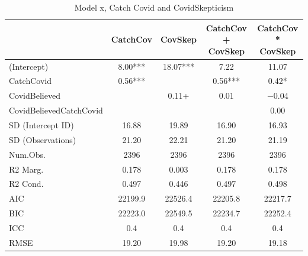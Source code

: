 \documentclass[]{report}
\begin{document}
\begin{table}
	
	\caption{Model x, Catch Covid and CovidSkepticism}
	\centering
	\begin{tabular}[t]{lcccc}
		\toprule
		& CatchCov & CovSkep & CatchCov + CovSkep & CatchCov * CovSkep\\
		\midrule
		(Intercept) & \num{8.00}*** & \num{18.07}*** & \num{7.22} & \num{11.07}\\
		CatchCovid & \num{0.56}*** &  & \num{0.56}*** & \num{0.42}*\\
		CovidBelieved &  & \num{0.11}+ & \num{0.01} & \num{-0.04}\\
		CovidBelievedCatchCovid &  &  &  & \num{0.00}\\
		SD (Intercept ID) & \num{16.88} & \num{19.89} & \num{16.90} & \num{16.93}\\
		SD (Observations) & \num{21.20} & \num{22.21} & \num{21.20} & \num{21.19}\\
		\midrule
		Num.Obs. & \num{2396} & \num{2396} & \num{2396} & \num{2396}\\
		R2 Marg. & \num{0.178} & \num{0.003} & \num{0.178} & \num{0.178}\\
		R2 Cond. & \num{0.497} & \num{0.446} & \num{0.497} & \num{0.498}\\
		AIC & \num{22199.9} & \num{22526.4} & \num{22205.8} & \num{22217.7}\\
		BIC & \num{22223.0} & \num{22549.5} & \num{22234.7} & \num{22252.4}\\
		ICC & \num{0.4} & \num{0.4} & \num{0.4} & \num{0.4}\\
		RMSE & \num{19.20} & \num{19.98} & \num{19.20} & \num{19.18}\\
		\bottomrule
	\end{tabular}
\end{table}
\end{document}
